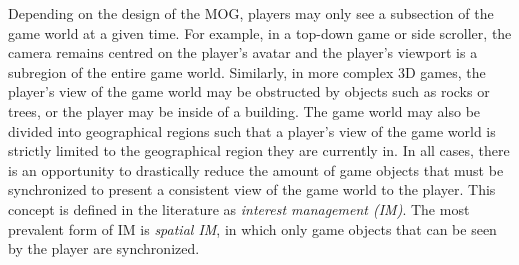 Depending on the design of the MOG, players may only see a subsection of the game world at a given time. For example, in a top-down game or side scroller, the camera remains centred on the player's avatar and the player's viewport is a subregion of the entire game world. Similarly, in more complex 3D games, the player's view of the game world may be obstructed by objects such as rocks or trees, or the player may be inside of a building. The game world may also be divided into geographical regions such that a player's view of the game world is strictly limited to the geographical region they are currently in. In all cases, there is an opportunity to drastically reduce the amount of game objects that must be synchronized to present a consistent view of the game world to the player. This concept is defined in the literature as \textit{interest management (IM)}. The most prevalent form of IM is \textit{spatial IM}, in which only game objects that can be seen by the player are synchronized.









